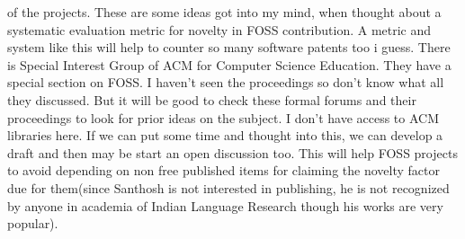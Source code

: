 of the projects.  These are some ideas got into my mind, when thought about a
systematic evaluation metric for novelty in FOSS contribution. A metric
and system like this will help to counter so many software patents too i guess.
There is Special Interest Group of ACM for Computer Science Education.
They have a special section on FOSS. I haven't seen the proceedings so
don't know what all they discussed. But it will be good to check these
formal forums and their proceedings to look for prior ideas on the subject.
I don't have access to ACM libraries here.  If we can put some time and
thought into this, we can develop a draft and then may be start an open
discussion too. This will help FOSS projects to avoid depending on non
free published items for claiming the novelty factor due for them(since
Santhosh is not interested in publishing, he is not recognized by anyone
in  academia of Indian Language Research though his works are very popular).


